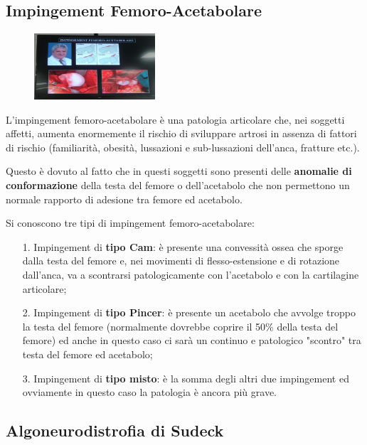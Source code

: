 \subsection{Impingement Femoro-Acetabolare}

\begin{figure}[!ht]
\centering
\includegraphics[width=0.4\textwidth]{019/image2.jpeg}
\end{figure}

L'impingement femoro-acetabolare è una patologia articolare che, nei soggetti affetti, aumenta enormemente il rischio di sviluppare artrosi in assenza di fattori di rischio (familiarità, obesità, lussazioni e sub-lussazioni dell'anca, fratture etc.).

Questo è dovuto al fatto che in questi soggetti sono presenti delle \textbf{anomalie di conformazione} della testa del femore o dell'acetabolo che non permettono un normale rapporto di adesione tra femore ed acetabolo.

Si conoscono tre tipi di impingement femoro-acetabolare:

\begin{itemize}
\item[1.]
  Impingement di \textbf{tipo Cam}: è presente una convessità ossea che sporge dalla testa del femore e, nei movimenti di flesso-estensione e di rotazione dall'anca, va a scontrarsi patologicamente con l'acetabolo e con la cartilagine articolare;
\item[2.]
  Impingement di \textbf{tipo Pincer}: è presente un acetabolo che avvolge troppo la testa del femore (normalmente dovrebbe coprire il 50\% della testa del femore) ed anche in questo caso ci sarà un continuo e patologico "scontro" tra testa del femore ed acetabolo;
\item[3.]
  Impingement di \textbf{tipo misto}: è la somma degli altri due impingement ed ovviamente in questo caso la patologia è ancora più grave.
\end{itemize}

\subsection{Algoneurodistrofia di Sudeck}

